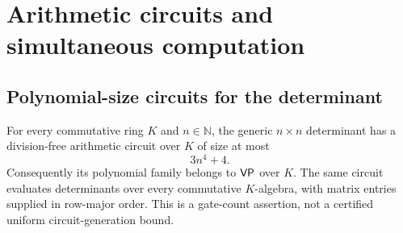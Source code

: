 \section{Arithmetic circuits and simultaneous computation}

\begin{result}
\subsection{Polynomial-size circuits for the determinant}
For every commutative ring $K$ and $n\in\mathbb N$, the generic $n\times n$
determinant has a division-free arithmetic circuit over $K$ of size at most
\[
3n^4+4.
\]
Consequently its polynomial family belongs to $\mathsf{VP}$ over $K$. The same circuit
evaluates determinants over every commutative $K$-algebra, with matrix entries
supplied in row-major order. This is a gate-count assertion, not a certified
uniform circuit-generation bound.\citep{Bird2011,Valiant1979Algebra}
\end{result}

